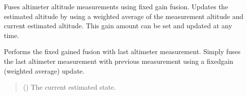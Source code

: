 \documentclass[letterpaper,10pt,english]{sphinxmanual}
\begin{document}
\begin{fulllineitems}
\label{\detokenize{modules/fusion/altimeter:qnav.fusion.altimeter.FixedGainAltimeter}}
\pysigstartsignatures
{}
\pysigstopsignatures
\sphinxAtStartPar
Fuses altimeter altitude measurements using fixed gain fusion.
Updates the estimated altitude by using a weighted average of the
measurement altitude and current estimated altitude. This gain
amount can be set and updated at any time.

\begin{fulllineitems}
\label{\detokenize{modules/fusion/altimeter:qnav.fusion.altimeter.FixedGainAltimeter.perform_fusion}}
\pysigstartsignatures
{}
\pysigstopsignatures
\sphinxAtStartPar
Performs the fixed gained fusion with last altimeter measurement.
Simply fuses the last altimeter measurement with previous measurement
using a fixed\sphinxhyphen{}gain (weighted average) update.
\begin{quote}\begin{description}
\sphinxAtStartPar
{} ({\hyperref[\detokenize{modules/estimation/state:qnav.estimation.state.EstimatedState}]{}}) \textendash{} The current estimated state.

\end{description}\end{quote}

\end{fulllineitems}


\end{fulllineitems}
\end{document}
